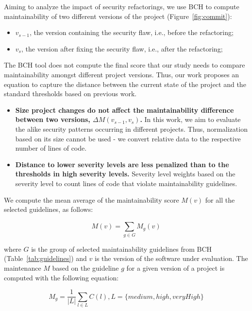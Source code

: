 \documentclass[10pt,conference]{IEEEtran}
\begin{document}
Aiming to analyze the impact of security refactorings, we use BCH to compute
maintainability of two different versions of the project (Figure~\ref{fig:commit}):
\begin{itemize}
	\item $v_{s-1}$, the version containing the security flaw, i.e., before the
	refactoring;
	\item $v_{s}$, the version after fixing the security flaw, i.e., after the
	refactoring;
\end{itemize}

The BCH tool does not compute the final score that our study needs to compare
maintainability amongst different project versions. Thus, our work proposes an
equation to capture the distance between the current state of the project and
the standard thresholds based on previous work\cite{Olivari:2018}.
\begin{itemize}
	\item \textbf{Size project changes do not affect the maintainability
	difference between two versions, $\Delta M (v_{s-1},v_{s})$.} In this work, we
	aim to evaluate the alike security patterns occurring in different projects.
	Thus, normalization based on its size cannot be used - we convert relative
	data to the respective number of lines of code.
	\item \textbf{Distance to lower severity levels are less penalized than to the
	thresholds in high severity levels.} Severity level weights based on the
	severity level to count lines of code that violate maintainability guidelines.
\end{itemize}

We compute the mean average of the maintainability score $M(v)$ for all the
selected guidelines, as follows:



\begin{equation}
    M(v) = \sum_{g \in G}^{} M_{g}(v)
\end{equation}

\noindent
where $G$ is the group of selected maintainability guidelines from BCH (Table~\ref{tab:guidelines}) and $v$ is the version of the software under evaluation.
The maintenance $M$ based on the guideline $g$ for a given version of a project
is computed with the following equation:

\begin{equation}
    M_{g} = \frac{1}{|L|} \sum_{l \in L}^{} C(l) , L = \{medium, high, veryHigh\}
\end{equation}
\end{document}
